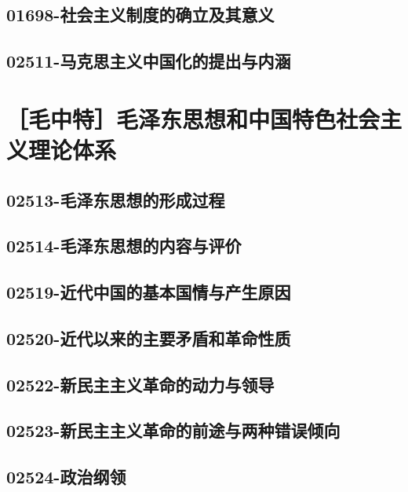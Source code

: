 \subsection{01698-社会主义制度的确立及其意义}

\subsection{02511-马克思主义中国化的提出与内涵}


\section{［毛中特］毛泽东思想和中国特色社会主义理论体系}

\subsection{02513-毛泽东思想的形成过程}

\subsection{02514-毛泽东思想的内容与评价}

\subsection{02519-近代中国的基本国情与产生原因}

\subsection{02520-近代以来的主要矛盾和革命性质}

\subsection{02522-新民主主义革命的动力与领导}

\subsection{02523-新民主主义革命的前途与两种错误倾向}

\subsection{02524-政治纲领}

